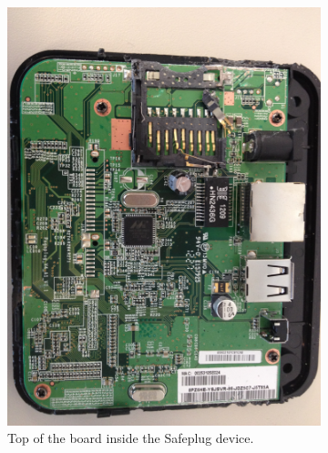 \begin{figure}[htb]
\centering
\begin{subfigure}[b]{.3\textwidth}
  \includegraphics[width=\textwidth]{safeplug_top}
  \caption{Top of the board inside the Safeplug device.}
  \label{fig:top}
\end{subfigure}%
\qquad
\begin{subfigure}[b]{.3\textwidth}

\end{subfigure}
\end{figure}
